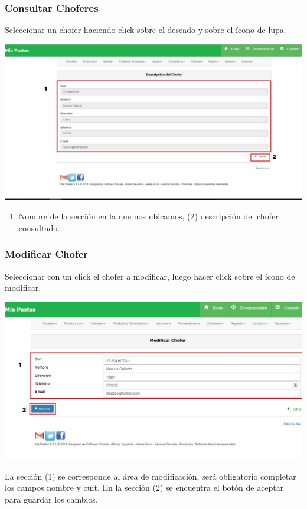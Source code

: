 \documentclass[letterpaper,10pt,english]{sphinxmanual}
\begin{document}
\subsubsection{Consultar Choferes}
\label{choferes:consultar-choferes}
Seleccionar un chofer haciendo click sobre el deseado y sobre el ícono de lupa.

\includegraphics{chofer_detalle.jpg}
\begin{enumerate}
\item {} 
Nombre de la sección en la que nos ubicamos, (2) descripción del chofer consultado.

\end{enumerate}


\subsubsection{Modificar Chofer}
\label{choferes:modificar-chofer}
Seleccionar con un click el chofer a modificar, luego hacer click sobre el ícono de modificar.

\includegraphics{chofer_modificar.jpg}

La sección (1) se corresponde al área de modificación, será obligatorio completar los campos nombre y cuit. En la sección (2) se encuentra el botón de aceptar para guardar los cambios.
\end{document}
